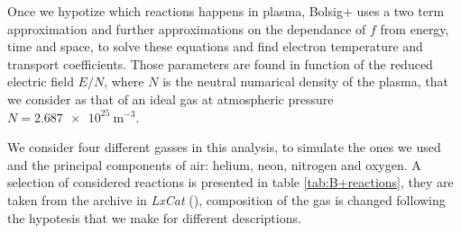 Once we hypotize which reactions happens in plasma, Bolsig+ uses a two term approximation and further approximations on the dependance of $f$ from energy, time and space, to solve these equations and find electron temperature and transport coefficients. Those parameters are found in function of the reduced electric field $E/N$, where $N$ is the neutral numarical density of the plasma, that we consider as that of an ideal gas at atmospheric pressure $N = \SI{2.687e25}{\meter^{-3}}$.


We consider four different gasses in this analysis, to simulate the ones we used and the principal components of air: helium, neon, nitrogen and oxygen. A selection of considered reactions is presented in table \ref{tab:B+reactions}, they are taken from the archive in \emph{LxCat} (\cite{LxCat}), composition of the gas is changed following the hypotesis that we make for different descriptions.
